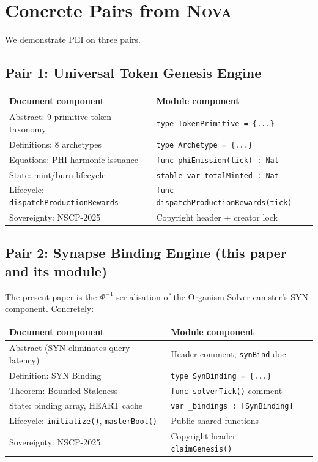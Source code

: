 \documentclass[12pt]{article}
\begin{document}
\section{Concrete Pairs from \textsc{Nova}}
\label{sec:examples}

We demonstrate PEI on three pairs.

\subsection{Pair 1: Universal Token Genesis Engine}

\begin{center}
\begin{tabular}{ll}
  \toprule
  Document component & Module component \\
  \midrule
  Abstract: 9-primitive token taxonomy & \texttt{type TokenPrimitive = \{...\}} \\
  Definitions: 8 archetypes            & \texttt{type Archetype = \{...\}} \\
  Equations: PHI-harmonic issuance     & \texttt{func phiEmission(tick) : Nat} \\
  State: mint/burn lifecycle           & \texttt{stable var totalMinted : Nat} \\
  Lifecycle: \texttt{dispatchProductionRewards} & \texttt{func dispatchProductionRewards(tick)} \\
  Sovereignty: NSCP-2025               & Copyright header $+$ creator lock \\
  \bottomrule
\end{tabular}
\end{center}

\subsection{Pair 2: Synapse Binding Engine (this paper and its module)}

The present paper is the $\Phi^{-1}$ serialisation of the Organism Solver
canister's SYN component.  Concretely:

\begin{center}
\begin{tabular}{ll}
  \toprule
  Document component & Module component \\
  \midrule
  Abstract (SYN eliminates query latency) & Header comment, \texttt{synBind} doc \\
  Definition: SYN Binding                 & \texttt{type SynBinding = \{...\}} \\
  Theorem: Bounded Staleness              & \texttt{func solverTick()} comment \\
  State: binding array, HEART cache       & \texttt{var \_bindings : [SynBinding]} \\
  Lifecycle: \texttt{initialize()}, \texttt{masterBoot()} & Public shared functions \\
  Sovereignty: NSCP-2025                  & Copyright header $+$ \texttt{claimGenesis()} \\
  \bottomrule
\end{tabular}
\end{center}
\end{document}
